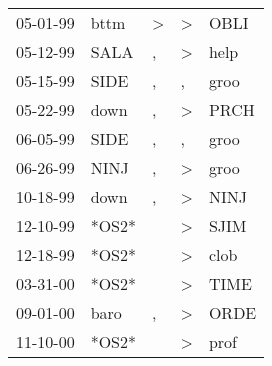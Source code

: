 \begin{supertabular}{lllll}
 05-01-99 &   bttm &  \textgreater &  \textgreater &   OBLI \\
 05-12-99 &   SALA &             , &  \textgreater &   help \\
 05-15-99 &   SIDE &             , &             , &   groo \\
 05-22-99 &   down &             , &  \textgreater &   PRCH \\
 06-05-99 &   SIDE &             , &             , &   groo \\
 06-26-99 &   NINJ &             , &  \textgreater &   groo \\
 10-18-99 &   down &             , &  \textgreater &   NINJ \\
 12-10-99 &  *OS2* &               &  \textgreater &   SJIM \\
 12-18-99 &  *OS2* &               &  \textgreater &   clob \\
 03-31-00 &  *OS2* &               &  \textgreater &   TIME \\
 09-01-00 &   baro &             , &  \textgreater &   ORDE \\
 11-10-00 &  *OS2* &               &  \textgreater &   prof \\
\end{supertabular}
